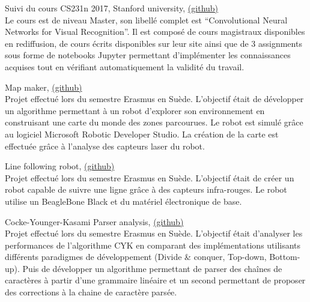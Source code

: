 {\large Suivi du cours CS231n 2017, Stanford university, \href{https://github.com/ThomasRanvier/stanford-cs231n}{(github)}}
\\
{\small Le cours est de niveau Master, son libell\'e complet est ``Convolutional Neural Networks for Visual Recognition''.
Il est compos\'e de cours magistraux disponibles en rediffusion, de cours \'ecrits disponibles sur leur site ainsi que de 3 assignments sous forme de notebooks Jupyter permettant d'impl\'ementer les connaissances acquises tout en v\'erifiant automatiquement la validit\'e du travail.}

\medskip
    
{\large Map maker, \href{https://github.com/ThomasRanvier/map_maker}{(github)}}
\\
{\small Projet effectu\'e lors du semestre Erasmus en Su\`ede. 
L'objectif \'etait de d\'evelopper un algorithme permettant \`a un robot d'explorer son environnement en construisant une carte du monde des zones parcourues.
Le robot est simul\'e gr\^ace au logiciel Microsoft Robotic Developer Studio.
La cr\'eation de la carte est effectu\'ee gr\^ace \`a l'analyse des capteurs laser du robot.}

\medskip
    
{\large Line following robot, \href{https://github.com/ThomasRanvier/line_following_robot}{(github)}}
\\
{\small Projet effectu\'e lors du semestre Erasmus en Su\`ede. 
L'objectif \'etait de cr\'eer un robot capable de suivre une ligne gr\^ace \`a des capteurs infra-rouges.
Le robot utilise un BeagleBone Black et du mat\'eriel \'electronique de base.}

\medskip

{\large Cocke-Younger-Kasami Parser analysis, \href{https://github.com/ThomasRanvier/cyk_algorithm_analysis}{(github)}}
\\
{\small Projet effectu\'e lors du semestre Erasmus en Su\`ede. 
L'objectif \'etait d'analyser les performances de l'algorithme CYK en comparant des impl\'ementations utilisants diff\'erents paradigmes de d\'eveloppement (Divide \& conquer, Top-down, Bottom-up).
Puis de d\'evelopper un algorithme permettant de parser des cha\^ines de caract\`eres \`a partir d'une grammaire lin\'eaire et un second permettant de proposer des corrections \`a la chaine de caract\`ere pars\'ee.}

\medskip

